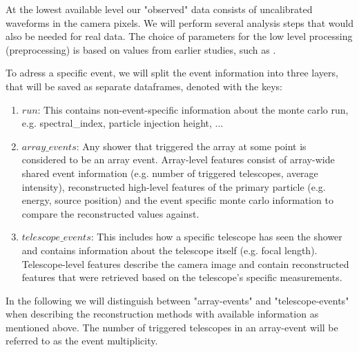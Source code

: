 
At the lowest available level our "observed" data consists of uncalibrated waveforms 
in the camera pixels.
We will perform several analysis steps that would also be needed for real data.
The choice of parameters for the low level processing (preprocessing)
is based on values from earlier studies, such as \cite{kai_diss}.

To adress a specific event, we will split the event information into
three layers, that will be saved as separate dataframes, denoted with the keys:
\begin{enumerate}
    \item{$run$: This contains non-event-specific information about the monte carlo run, e.g.
    spectral\_index, particle injection height, ...}
    \item{$array\_events$: Any shower that triggered the array at some point 
    is considered to be an array event.
    Array-level features consist of array-wide shared event information 
    (e.g. number of triggered telescopes, average intensity),
    reconstructed high-level features of the primary particle (e.g. energy, source position) and the 
    event specific monte carlo information to compare the reconstructed values against.}
    \item{$telescope\_events$: This includes how a specific telescope has seen the shower and
    contains information about the telescope itself (e.g. focal length). Telescope-level features 
    describe the camera image and contain reconstructed features that were retrieved based on 
    the telescope's specific measurements.}
\end{enumerate}
In the following we will 
distinguish between "array-events" and "telescope-events" when describing the reconstruction methods
with available information as mentioned above.
The number of triggered telescopes in an array-event 
will be referred to as the event multiplicity.

